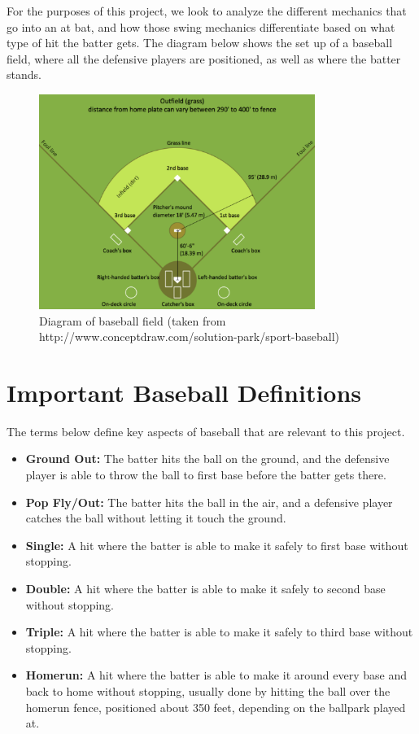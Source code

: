 \documentclass[
  letterpaper,
  DIV=11,
  numbers=noendperiod]{scrartcl}
\providecommand{\tightlist}{%
  \setlength{\itemsep}{0pt}\setlength{\parskip}{0pt}}\usepackage{longtable,booktabs,array}
\begin{document}
For the purposes of this project, we look to analyze the different
mechanics that go into an at bat, and how those swing mechanics
differentiate based on what type of hit the batter gets. The diagram
below shows the set up of a baseball field, where all the defensive
players are positioned, as well as where the batter stands.

\begin{figure}[H]

{\centering \includegraphics[width=0.8\textwidth,height=0.8\textheight]{baseball.png}

}

\caption{Diagram of baseball field (taken from
http://www.conceptdraw.com/solution-park/sport-baseball)}

\end{figure}%

\section{Important Baseball
Definitions}\label{important-baseball-definitions}

The terms below define key aspects of baseball that are relevant to this
project.

\begin{itemize}
\tightlist
\item
  \textbf{Ground Out:} The batter hits the ball on the ground, and the
  defensive player is able to throw the ball to first base before the
  batter gets there.
\item
  \textbf{Pop Fly/Out:} The batter hits the ball in the air, and a
  defensive player catches the ball without letting it touch the ground.
\item
  \textbf{Single:} A hit where the batter is able to make it safely to
  first base without stopping.
\item
  \textbf{Double:} A hit where the batter is able to make it safely to
  second base without stopping.
\item
  \textbf{Triple:} A hit where the batter is able to make it safely to
  third base without stopping.
\item
  \textbf{Homerun:} A hit where the batter is able to make it around
  every base and back to home without stopping, usually done by hitting
  the ball over the homerun fence, positioned about 350 feet, depending
  on the ballpark played at.
\end{itemize}
\end{document}
